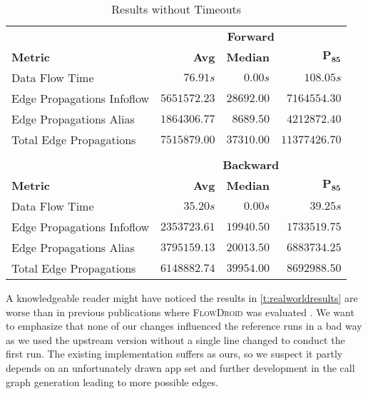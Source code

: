 \documentclass[../draft.tex]{subfiles}
\begin{document}
    \begin{table}[tbp]
        \centering
        \begin{tabular}{l | r | r | r}
            & \multicolumn{3}{c}{\textbf{Forward}}\\
            \textbf{Metric} & \textbf{Avg} & \textbf{Median} & $\mathbf{P_{85}}$\\
            \hline\hline
            Data Flow Time & $76.91s$ & $0.00s$ & $108.05s$\\
            \hline
            Edge Propagations Infoflow & $5651572.23$ & $28692.00$ & $7164554.30$\\
            Edge Propagations Alias & $1864306.77$ & $8689.50$ & $4212872.40$\\
            Total Edge Propagations & $7515879.00$ & $37310.00$ & $11377426.70$\\
            \multicolumn{4}{c}{}\\
            & \multicolumn{3}{c}{\textbf{Backward}}\\
            \textbf{Metric} & \textbf{Avg} & \textbf{Median} & $\mathbf{P_{85}}$\\
            \hline\hline
            Data Flow Time & $35.20s$ & $0.00s$ & $39.25s$\\
            \hline
            Edge Propagations Infoflow & $2353723.61$ & $19940.50$ & $1733519.75$\\
            Edge Propagations Alias & $3795159.13$ & $20013.50$ & $6883734.25$\\
            Total Edge Propagations & $6148882.74$ & $39954.00$ & $8692988.50$\\
        \end{tabular}
        \caption{Results without Timeouts}
        \label{t:realworldresultswithouttimeout}
    \end{table}

    A knowledgeable reader might have noticed the results in \autoref{t:realworldresults} are worse than in previous publications where \textsc{FlowDroid} was evaluated \cite{Arzt2017PhD, Arzt2021}.
    We want to emphasize that none of our changes influenced the reference runs in a bad way as we used the upstream version without a single line changed to conduct the first run\footnotemark{}.
    The existing implementation suffers as ours, so we suspect it partly depends on an unfortunately drawn app set and further development in the call graph generation leading to more possible edges.
\end{document}
